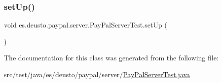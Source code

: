 \subsubsection{\texorpdfstring{setUp()}{setUp()}}
{\footnotesize\ttfamily void es.\+deusto.\+paypal.\+server.\+Pay\+Pal\+Server\+Test.\+set\+Up (\begin{DoxyParamCaption}{ }\end{DoxyParamCaption})}



The documentation for this class was generated from the following file\+:\begin{DoxyCompactItemize}
\item 
src/test/java/es/deusto/paypal/server/\mbox{\hyperlink{_pay_pal_server_test_8java}{Pay\+Pal\+Server\+Test.\+java}}\end{DoxyCompactItemize}
